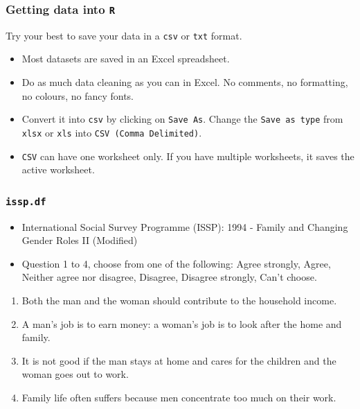 \documentclass[handout]{beamer}\usepackage[]{graphicx}\usepackage[]{color}
\begin{document}
\begin{frame}[fragile]
  \frametitle{Getting data into \texttt{R}}
  Try your best to save your data in a \texttt{csv} or
    \texttt{txt} format.
    \begin{itemize}
    \item Most datasets are saved in an Excel spreadsheet.
    \item Do as much data cleaning as you can in Excel. No comments,
      no formatting, no colours, no fancy fonts.
    \item Convert it into \texttt{csv} by clicking on \texttt{Save
        As}. Change the \texttt{Save
        as type} from \texttt{xlsx} or \texttt{xls} into \texttt{CSV
        (Comma Delimited)}.
    \item \texttt{CSV} can have one worksheet only. If you have
      multiple worksheets, it saves the active worksheet.
    \end{itemize}
\end{frame}

\begin{frame}
  \frametitle{\texttt{issp.df}}
  \begin{itemize}
\item International Social Survey Programme (ISSP): 1994 - Family and Changing Gender Roles II (Modified)
\item Question 1 to 4, choose from one of the following: Agree strongly, Agree, Neither agree nor disagree, Disagree, Disagree strongly, Can't choose.
  \end{itemize}
\begin{enumerate}
\item Both the man and the woman should contribute to the household income.
\item A man's job is to earn money: a woman's job is to look after the home and family.
\item It is not good if the man stays at home and cares for the children and the woman goes out to work.
\item Family life often suffers because men concentrate too much on their work.
\end{enumerate}
\end{frame}
\end{document}
